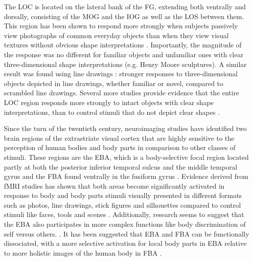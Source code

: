 The \gls{LOC} is located on the lateral bank of the \gls{FG}, extending both ventrally and dorsally, consisting of the \gls{MOG} and the \gls{IOG} as well as the \gls{LOS} between them. This region has been shown to respond more strongly when subjects passively view photographs of common everyday objects than when they view visual textures without obvious shape interpretations \cite{Malach1995}. Importantly, the magnitude of the response was no different for familiar objects and unfamiliar ones with clear three-dimensional shape interpretations (e.g. Henry Moore sculptures). A similar result was found using line drawings \cite{Kanwisher1996}: stronger responses to three-dimensional objects depicted in line drawings, whether familiar or novel, compared to scrambled line drawings. Several more studies provide evidence that the entire \gls{LOC} region responds more strongly to intact objects with clear shape interpretations, than to control stimuli that do not depict clear shapes \cite{Kalanit1998, Murtha1999, Kalanit2001}.

Since the turn of the twentieth century, neuroimaging studies have identified two brain regions of the extrastriate visual cortex that are highly sensitive to the perception of human bodies and body parts in comparison to other classes of stimuli. These regions are the \gls{EBA}, which is a body-selective focal region located partly at  both the posterior inferior temporal sulcus and the middle temporal gyrus \cite{Downing2001} and the \gls{FBA} found ventrally in the fusiform gyrus \cite{Peelen2005}. Evidence derived from \gls{fMRI} studies has shown that both areas become significantly activated in response to body and body parts stimuli visually presented in different formats such as photos, line drawings, stick figures and silhouettes compared to control stimuli like faces, tools and scenes \cite{Spiridon2006, Weiner2010, Amoruso2011}. Additionally, research seems to suggest that the \gls{EBA} also participates in more complex functions like body discrimination of self versus others. \cite{Pann2021}. It has been suggested that \gls{EBA} and \gls{FBA} can be functionally dissociated, with a more selective activation for local body parts in \gls{EBA} relative to more holistic images of the human body in \gls{FBA} \cite{Taylor2007}.

